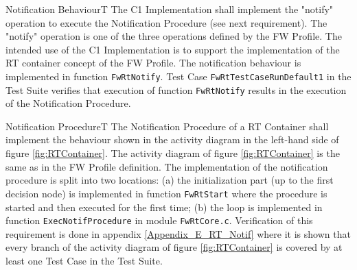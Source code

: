 \documentclass[requirements]{../fwprofile}
\begin{document}
\newpage 

\begin{fw_req}{Notification Behaviour}{T}
{The C1 Implementation shall implement the "notify" operation to execute the Notification Procedure (see next requirement).}
{The "notify" operation is one of the three operations defined by the FW Profile. The intended use of the C1 Implementation is to support the implementation of the RT container concept of the FW Profile.}
{The notification behaviour is implemented in function \texttt{FwRtNotify}.} 
{Test Case \texttt{FwRtTestCaseRunDefault1} in the Test Suite verifies that execution of function \texttt{FwRtNotify} results in the execution of the Notification Procedure.}
\end{fw_req}

\begin{fw_req}{Notification Procedure}{T}
{The Notification Procedure of a RT Container shall implement the behaviour shown in the activity diagram in the left-hand side of figure \ref{fig:RTContainer}.}
{The activity diagram of figure \ref{fig:RTContainer} is the same as in the FW Profile definition.}
{The implementation of the notification procedure is split into two locations: (a) the initialization part (up to the first decision node) is implemented in function \texttt{FwRtStart} where the procedure is started and then executed for the first time; (b) the loop is implemented in function \texttt{ExecNotifProcedure} in module \texttt{FwRtCore.c}.} 
{Verification of this requirement is done in appendix \ref{Appendix_E_RT_Notif} where it is shown that every branch of the activity diagram of figure \ref{fig:RTContainer} is covered by at least one Test Case in the Test Suite.}
\end{fw_req}
\end{document}
